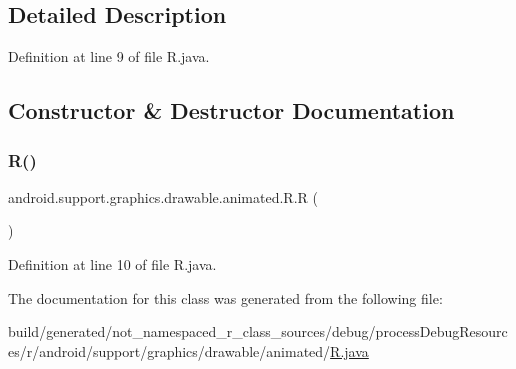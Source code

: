\subsection{Detailed Description}


Definition at line 9 of file R.\+java.



\subsection{Constructor \& Destructor Documentation}
\mbox{\label{classandroid_1_1support_1_1graphics_1_1drawable_1_1animated_1_1_r_a097d34d9cd60fadc6a4ed075ffdd2f7b}} 
\subsubsection{\texorpdfstring{R()}{R()}}
{\footnotesize\ttfamily android.\+support.\+graphics.\+drawable.\+animated.\+R.\+R (\begin{DoxyParamCaption}{ }\end{DoxyParamCaption})\hspace{0.3cm}{\ttfamily [private]}}



Definition at line 10 of file R.\+java.


\begin{DoxyCode}{0}

\end{DoxyCode}


The documentation for this class was generated from the following file\+:\begin{DoxyCompactItemize}
\item 
build/generated/not\+\_\+namespaced\+\_\+r\+\_\+class\+\_\+sources/debug/process\+Debug\+Resources/r/android/support/graphics/drawable/animated/\mbox{\hyperlink{android_2support_2graphics_2drawable_2animated_2_r_8java}{R.\+java}}\end{DoxyCompactItemize}
